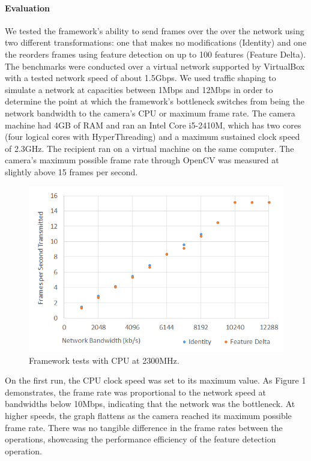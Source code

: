 \paragraph{Evaluation}

We tested the framework's ability to send frames over the over the network
using two different transformations: one that makes no modifications
(Identity) and one the reorders frames using feature detection on up to
100 features (Feature Delta).  The benchmarks were conducted over a
virtual network supported by VirtualBox with a tested network speed of about 1.5Gbps.
We used traffic shaping to simulate a network at capacities between 1Mbps and 12Mbps in order to
determine the point at which the framework's bottleneck switches from being the
network bandwidth to the camera's CPU or maximum frame rate.  The camera machine had 4GB of RAM
and ran an Intel Core i5-2410M, which has two cores (four logical cores with HyperThreading)
and a maximum sustained clock speed of 2.3GHz.  The recipient
ran on a virtual machine on the same computer.  The camera's maximum possible
frame rate through OpenCV was measured at slightly above 15 frames per second.

\begin{figure}[h]
\includegraphics[width=\columnwidth]{figure3.png}
\caption{Framework tests with CPU at 2300MHz.}
\end{figure}

On the first run, the CPU clock speed was set to its maximum value. As Figure 1
demonstrates, the frame rate was proportional to the network speed at bandwidths
below 10Mbps, indicating that the network was the bottleneck.  At higher speeds,
the graph flattens as the camera reached its maximum possible frame rate.
There was no tangible difference in the frame rates between the operations,
showcasing the performance efficiency of the feature detection operation.

